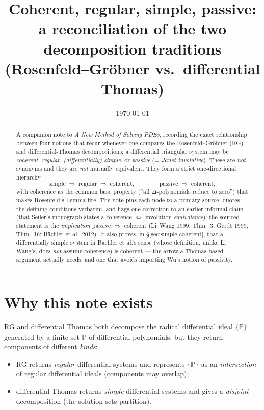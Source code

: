 \documentclass[11pt]{article}
\title{Coherent, regular, simple, passive:\\
       a reconciliation of the two decomposition traditions\\
       {\large (Rosenfeld--Gr\"obner vs.\ differential Thomas)}}
\author{}
\date{\today}
\newcommand{\PP}{\mathbb{P}}
\newcommand{\imp}{\;\Longrightarrow\;}
\begin{document}
\maketitle

\begin{abstract}
\noindent
A companion note to \emph{A New Method of Solving PDEs}, recording the exact
relationship between four notions that recur whenever one compares the
Rosenfeld--Gr\"obner (RG) and differential-Thomas decompositions: a differential
triangular system may be \emph{coherent}, \emph{regular}, \emph{(differentially)
simple}, or \emph{passive} (\emph{= Janet-involutive}). These are \emph{not}
synonyms and they are \emph{not} mutually equivalent. They form a strict
one-directional hierarchy
\[
  \text{simple}\imp\text{regular}\imp\text{coherent},
  \qquad\qquad
  \text{passive}\imp\text{coherent},
\]
with coherence as the common base property (``all $\Delta$-polynomials reduce to
zero'') that makes Rosenfeld's Lemma fire. The note pins each node to a primary
source, quotes the defining conditions verbatim, and flags one correction to an
earlier informal claim (that Seiler's monograph states a coherence
$\Leftrightarrow$ involution \emph{equivalence}): the sourced statement is the
\emph{implication} passive $\Rightarrow$ coherent (Li--Wang 1999, Thm.~3;
Gerdt 1999, Thm.~16; B\"achler et al.\ 2012). It also proves, in
\S\ref{sec:simple-coherent}, that a differentially simple system in
B\"achler et al.'s sense (whose definition, unlike Li--Wang's, does
\emph{not} assume coherence) is coherent --- the arrow a Thomas-based argument
actually needs, and one that avoids importing Wu's notion of passivity.
\end{abstract}

\section{Why this note exists}

RG and differential Thomas both decompose the radical differential ideal
$\{\PP\}$ generated by a finite set $\PP$ of differential polynomials, but they
return components of different \emph{kinds}:
\begin{itemize}
  \item RG returns \emph{regular} differential systems and represents
        $\{\PP\}$ as an \emph{intersection} of regular differential ideals
        (components may overlap);
  \item differential Thomas returns \emph{simple} differential systems and
        gives a \emph{disjoint} decomposition (the solution sets partition).
\end{itemize}
\end{document}
